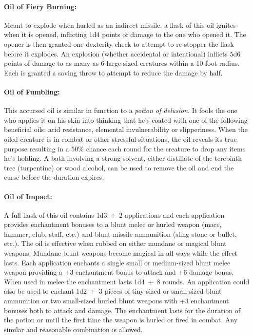 \begin{multicols}{2}
\paragraph{Oil of Fiery Burning:} Meant to explode when hurled as an indirect missile, a flask of this oil ignites when it is opened, inflicting 1d4 points of damage to the one who opened it.  The opener is then granted one dexterity check to attempt to re-stopper the flask before it explodes.  An explosion (whether accidental or intentional) inflicts 5d6 points of damage to as many as 6 large-sized creatures within a 10-foot radius.  Each is granted a saving throw to attempt to reduce the damage by half.
 
\paragraph{Oil of Fumbling:} This accursed oil is similar in function to a \textit{potion of delusion}.  It fools the one who applies it on his skin into thinking that he's coated with one of the following beneficial oils: acid resistance, elemental invulnerability or slipperiness.  When the oiled creature is in combat or other stressful situations, the oil reveals its true purpose resulting in a 50\% chance each round for the creature to drop any items he's holding.  A bath involving a strong solvent, either distillate of the terebinth tree (turpentine) or wood alcohol, can be used to remove the oil and end the curse before the duration expires.

\paragraph{Oil of Impact:} A full flask of this oil contains 1d3~+~2 applications and each application provides enchantment bonuses to a blunt melee or hurled weapon (mace, hammer, club, staff, etc.) and blunt missile ammunition (sling stone or bullet, etc.).  The oil is effective when rubbed on either mundane or magical blunt weapons.  Mundane blunt weapons become magical in all ways while the effect lasts.  Each application enchants a single small or medium-sized blunt melee weapon providing a +3 enchantment bonus to attack and +6 damage bonus. When used in melee the enchantment lasts 1d4~+~8 rounds.  An application could also be used to enchant 1d2~+~3 pieces of tiny-sized or small-sized blunt ammunition or two small-sized hurled blunt weapons with +3 enchantment bonuses both to attack and damage.  The enchantment lasts for the duration of the potion or until the first time the weapon is hurled or fired in combat.  Any similar and reasonable combination is allowed.


\end{multicols}
